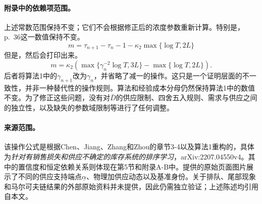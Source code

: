 \documentclass{article}
\begin{document}
\paragraph{附录中的依赖项范围。}
上述常数范围保持不变；它们不会根据修正后的浓度参数重新计算。特别是，p.\ 36这一数值保持不变。
\[
m=\tau_{n+1}-\tau_n-1-\kappa_2\max\{\log T,2L\}
\]
但是，然后会打印出来。
\[
m=\kappa_2\left(
\max\{\gamma_n^{-2}\log T,3L\}-\max\{\log T,2L\}\right).
\]
后者将算法1中的\(\gamma_{n+1}\)改为\(\gamma_n\)，并省略了减一的操作。这只是一个证明层面的不一致性，并非一种替代性的操作规则。算法和经验成本分母仍然保持算法1中的数值不变。为了修正这些问题，没有对\(\bar D\)的供应限制、四舍五入规则、需求与供应之间的独立性，以及缺失的参数域限制等进行了任何调整。

\paragraph{来源范围。}
该操作公式是根据Chen、Jiang、Zhang和Zhou的章节3-4以及算法1重构的，具体为\emph{针对有销售损失和供应不确定的库存系统的排序学习}，arXiv:2207.04550v4。其中的置信度和恒定依赖关系则体现在第5节和附录A-B中。提供的原始页面图片展示了不同的供应支持端点\(\underline\alpha\)、物理加供应动态以及基准身份。关于排队、尾部现象和马尔可夫链结果的外部原始资料并未提供，因此仍需独立验证；上述陈述均引用自本文。
\end{document}
